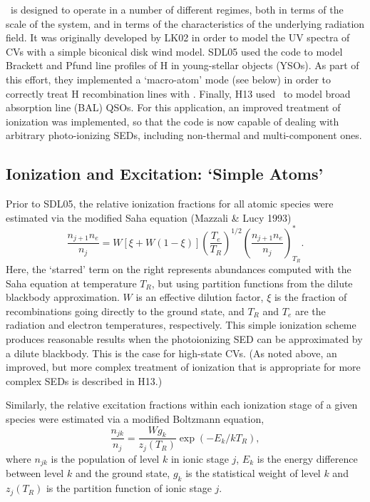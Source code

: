\documentclass[preprint, a4paper, 11pt]{aastex}
\begin{document}
\py\ is designed to operate in a number of different
regimes, both in terms of the scale of the system, and in terms of the
characteristics of the underlying radiation field.
It was originally developed by LK02 in order to model the UV spectra
of CVs with a simple biconical disk wind model. SDL05
\nocite{simmacro2005} used the code to model Brackett
and Pfund line profiles of H in young-stellar objects (YSOs). As part
of this effort, they implemented a `macro-atom' mode (see below) in
order to correctly treat H recombination lines with
\py. Finally, H13 used \py\ to model broad absorption line (BAL) QSOs. For
this application, an improved treatment of ionization was implemented,
so that the code is now capable of dealing with arbitrary
photo-ionizing SEDs, including non-thermal and multi-component ones. 

\subsection{Ionization and Excitation: `Simple Atoms'}
\label{simpleatoms}

Prior to SDL05, the relative ionization fractions for all atomic
species were estimated via the modified Saha equation (Mazzali \&
Lucy 1993)  
\begin{equation}
\frac{n_{j+1} n_e}{n_j} = W [\xi + W(1-\xi)]
\left(\frac{T_e}{T_R}\right)^{1/2}
\left(\frac{n_{j+1}n_e}{n_j}\right)^*_{T_R}. \label{ionization}
\end{equation}
Here, the `starred' term on the right represents abundances computed with
the Saha equation at temperature $T_R$, but using partition functions
from the dilute blackbody approximation. 
$W$ is an effective dilution factor, $\xi$ is the
fraction of recombinations going directly to the ground state, and
$T_R$ and $T_e$ are the radiation and electron temperatures,
respectively. This simple ionization scheme produces reasonable
results when the photoionizing SED can be approximated by a dilute
blackbody. This is the case for high-state CVs. (As noted above, an
improved, but more complex treatment of ionization that is appropriate
for more complex SEDs is described in H13.) 

Similarly, the relative excitation fractions within each ionization
stage of a given species were estimated via a modified Boltzmann
equation,
\begin{equation}
\frac{n_{jk}}{n_j} = \frac{W g_k}{z_j(T_R)} \exp(-E_k/kT_R),
\end{equation}
where $n_{jk}$ is the population of level $k$ in ionic stage $j$,
$E_k$ is the energy difference between level $k$ and the ground state,
$g_k$ is the statistical weight of level $k$
and $z_j(T_R)$ is the partition function of ionic stage $j$. 
\end{document}
